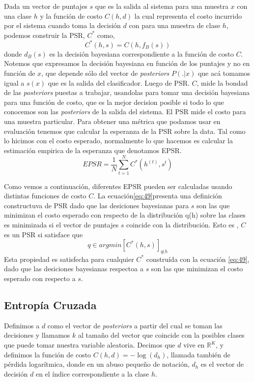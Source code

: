 \documentclass{book}
\begin{document}
Dada un vector de puntajes $s$ que es la salida al sistema para una muestra $x$ con una clase $h$ y la función de costo $C(h,d)$ la cual representa el costo incurrido por el sistema cuando toma la decisión $d$ con para una muestra de clase $h$, podemos construir la PSR, $C^*$ como, 
\begin{equation}
    C^*(h,s)=C(h,f_B(s))
    \label{eq:49}     
\end{equation}
donde $d_B(s)$ es la decisión bayesiana correspondiente a la función de costo $C$. Notemos que expresamos la decisión bayesiana en función de los puntajes y no en función de $x$, que depende sólo del vector de \textit{posteriors} $P(.|x)$ que acá tomamos igual a $s(x)$ que es la salida del clasificador. Luego de PSR. $C$, mide la bondad de las \textit{posteriors} puestas a trabajar, usandolas para tomar una decisión bayesiana para una función de costo, que es la mejor decision posible si todo lo que conocemos son las \textit{posteriors} de la salida del sistema.
El PSR mide el costo para una muestra particular. Para obtener una métrica que podamos usar en evaluación tenemos que calcular la esperanza de la PSR sobre la data. Tal como lo hicimos con el costo esperado, normalmente lo que hacemos es calcular la estimación empirica de la esperanza que denotamos EPSR.
\begin{equation}
EPSR = \frac{1}{N} \sum_{t=1}^N C^*(h^{(t)}, s^{t}) 
\label{eq:50}     
\end{equation}

Como vemos a continuación, diferentes EPSR pueden ser calculadas usando distintas funciones de costo $C$. 
La ecuación\ref{eq:49}presenta una definición constructuva de PSR dado que las desiciones bayesianas para $s$ son las que minimizan el costo esperado con respecto de la distribución q(h) sobre las clases es minimizada si el vector de puntajes $s$ coincide con la distribución. Esto es , $C$ es un PSR si satisface que
\begin{equation}
    q \in argmin [C^*(h,s)]_{q(h}
\end{equation}
Esta propiedad es satisfecha para cualquier $C^*$ construída con la ecuación \ref{eq:49}, dado que las desiciones bayesianas respectoa a $s$ son las que minimizan el costo esperado con respecto a $s$.

\subsection{Entropía Cruzada}

Definimos a $d$ como el vector de \textit{posteriors} a partir del cual se toman las decisiones y llamamos $k$ al tamaño del vector que coincide con la posibles clases que puede tomar nuestra variable aleatoria. Decimos que $d$ vive en $\mathbb{R}^K$,  y definimos la función de costo $C(h,d)=-\log (d_{h})$, llamada también de pérdida logarítmica, donde en un abuso pequeño de notación, $d_h$ es el vector de decisión $d$ en el índice correspondiente a la clase $h$. \\
\end{document}
